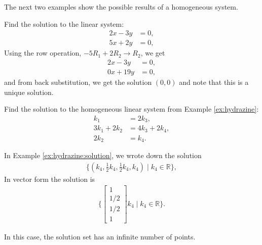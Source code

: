 The next two examples show the possible results of a homogeneous system.

\begin{example}
Find the solution to the linear system:
%
\begin{align*}
2x - 3y & = 0, \\
5x + 2y & =0,
\end{align*}
Using the row operation, $-5R_1 + 2R_2  \rightarrow R_2$, we get
%
\begin{align*}
2x - 3y & = 0, \\
0x + 19y & = 0,
\end{align*}
and from back substitution, we get the solution $(0,0)$ and note that this is a unique solution.
\end{example}

\begin{example} \label{ex:hydrazine:solution}
Find the solution to the homogeneous linear system from Example \ref{ex:hydrazine}:
\begin{align*}
k_1 & = 2k_3, \\
3k_1 + 2k_2 & = 4k_3 + 2k_4, \\
2k_2 & = k_4.
\end{align*}

\solution

In Example \ref{ex:hydrazine:solution}, we wrote down the solution
\begin{align*}
\{ (k_4, \frac{1}{2} k_4, \frac{1}{2} k_4, k_4) \; | \; k_4 \in \mathbb{R} \},
\end{align*}
In vector form the solution is
%
\begin{align*}
\{ \begin{bmatrix}
1 \\ 1/2 \\ 1/2 \\ 1
\end{bmatrix} k_4 \; | \; k_4 \in \mathbb{R} \}.
\end{align*}

In this case, the solution set has an infinite number of points.
\end{example}


